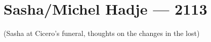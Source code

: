 \hypertarget{sashamichel-hadje-2113}{%
\chapter*{Sasha/Michel Hadje — 2113}\label{sashamichel-hadje-2113}}

(Sasha at Cicero's funeral, thoughts on the changes in the lost)
